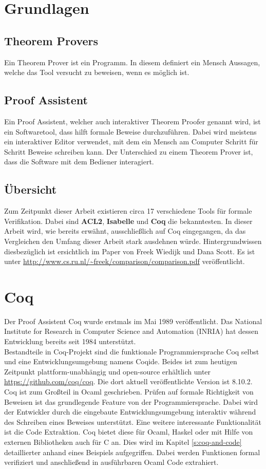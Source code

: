 \section{Grundlagen}
\subsection{Theorem Provers}
Ein Theorem Prover ist ein Programm.
In diesem definiert ein Mensch Aussagen, welche das Tool versucht zu beweisen, wenn es möglich ist.

\subsection{Proof Assistent}
Ein Proof Assistent, welcher auch interaktiver Theorem Proofer genannt wird, ist ein Softwaretool, dass hilft formale Beweise durchzuführen. Dabei wird meistens ein interaktiver Editor verwendet, mit dem ein Mensch am Computer Schritt für Schritt Beweise schreiben kann. Der Unterschied zu einem Theorem Prover ist, dass die Software mit dem Bediener interagiert.

\subsection{Übersicht}
Zum Zeitpunkt dieser Arbeit existieren circa 17 verschiedene Tools für formale Verifikation. Dabei sind \textbf{ACL2}, \textbf{Isabelle} und \textbf{Coq} die bekanntesten.\cite{WIEDIJK01:FP}
In dieser Arbeit wird, wie bereits erwähnt, ausschließlich auf Coq eingegangen, da das Vergleichen den Umfang dieser Arbeit stark ausdehnen würde. Hintergrundwissen diesbezüglich ist ersichtlich im Paper von Freek Wiedijk und Dana Scott. Es ist unter \url{http://www.cs.ru.nl/~freek/comparison/comparison.pdf} veröffentlicht. 

\section{Coq}
Der Proof Assistent Coq wurde erstmals im Mai 1989 veröffentlicht. Das National Institute for Research in Computer Science and Automation (INRIA) hat dessen Entwicklung bereits seit 1984 unterstützt. \\
Bestandteile in Coq-Projekt sind die funktionale Programmiersprache Coq selbst und eine Entwicklungsumgebung namens Coqide. Beides ist zum heutigen Zeitpunkt plattform-unabhängig und open-source erhältlich unter \url{https://github.com/coq/coq}. Die dort aktuell veröffentlichte Version ist 8.10.2.\cite{COQ01:FV}\\
Coq ist zum Großteil in Ocaml geschrieben. Prüfen auf formale Richtigkeit von Beweisen ist das grundlegende Feature von der Programmiersprache. Dabei wird der Entwickler durch die eingebaute Entwicklungsumgebung interaktiv während des Schreiben eines Beweises unterstützt. Eine weitere interessante Funktionalität ist die Code Extraktion. Coq bietet diese für Ocaml, Haskel oder mit Hilfe von externen Bibliotheken auch für C an. Dies wird im Kapitel \ref{s:coq-and-code} detaillierter anhand eines Beispiels aufgegriffen. Dabei werden Funktionen formal verifiziert und anschließend in ausführbaren Ocaml Code extrahiert.

